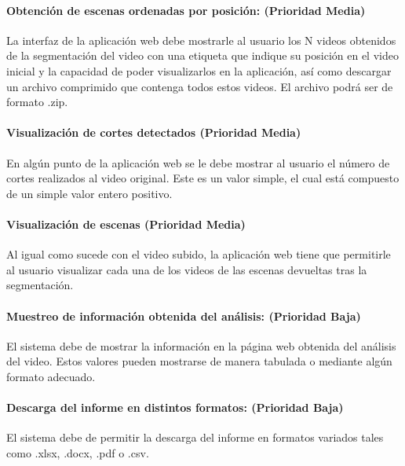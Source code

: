 \documentclass[a4paper]{article}
\begin{document}
{    	\paragraph{Obtención de escenas ordenadas por posición: (Prioridad Media)}
        	La interfaz de la aplicación web debe mostrarle al usuario los N videos obtenidos de la segmentación del video con una etiqueta que indique su posición en el video inicial y la capacidad de poder visualizarlos en la aplicación, así como descargar un archivo comprimido que contenga todos estos videos. El archivo podrá ser de formato .zip. \\
            
        \paragraph{Visualización de cortes detectados (Prioridad Media)} 
        	En algún punto de la aplicación web se le debe mostrar al usuario el número de cortes realizados al video original. Este es un valor simple, el cual está compuesto de un simple valor entero positivo. \\
            
        \paragraph{Visualización de escenas (Prioridad Media)}
        	Al igual como sucede con el video subido, la aplicación web tiene que permitirle al usuario visualizar cada una de los videos de las escenas devueltas tras la segmentación.  \\
            
        \paragraph{Muestreo de información obtenida del análisis: (Prioridad Baja)}
        	El sistema debe de mostrar la información en la página web obtenida del análisis del video. Estos valores pueden mostrarse de manera tabulada o mediante algún formato adecuado.    \\ 
            
        \paragraph{Descarga del informe en distintos formatos: (Prioridad Baja)}
        	El sistema debe de permitir la descarga del informe en formatos variados tales como .xlsx, .docx, .pdf o .csv.   \\ 
            
}
\end{document}
